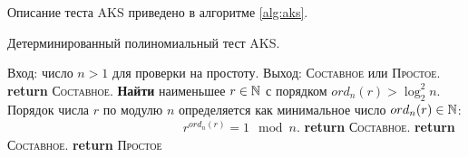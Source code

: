 Описание теста AKS приведено в алгоритме \ref{alg:aks}.

\begin{algorithm}[h!]
    \caption{Детерминированный полиномиальный тест AKS.\label{alg:aks}}
    \begin{algorithmic}
        \STATE Вход: число $n>1$ для проверки на простоту.
        \STATE Выход: \textsc{Составное} или \textsc{Простое}.
           \STATE \textbf{return} \textsc{Составное}.
        \ENDIF
        \STATE \textbf{Найти} наименьшее $r \in \mathbb{N}$ с порядком $ord_n(r) > \log_2^2 n$. Порядок числа $r$ по модулю $n$ определяется как минимальное число $ord_n(r) \in \mathbb{N}$: \\
            \indent ~~~~~~~~~~~~~~~~~~~~~~~~~~~ $r^{ord_n(r)} = 1 \mod n$.
           \STATE \textbf{return} \textsc{Составное}.
        \ENDIF
                \STATE \textbf{return} \textsc{Составное}.
            \ENDIF
        \ENDFOR
        \STATE \textbf{return} \textsc{Простое}
    \end{algorithmic}
\end{algorithm}
